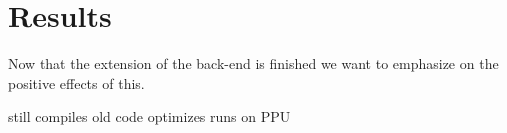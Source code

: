 \chapter{Results}
\label{chapter:results}

Now that the extension of the back-end is finished we want to emphasize on the positive effects of this.



still compiles old code
optimizes
runs on PPU

